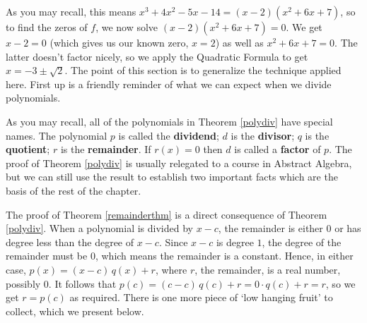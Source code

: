 \setlength\arraycolsep{5pt}
\setlength\extrarowheight{0pt}

As you may recall, this means $x^3 + 4x^2-5x-14=(x-2)\left(x^2+6x+7\right)$, so to find the zeros of $f$, we now solve $(x-2)\left(x^2+6x+7\right)=0$.   We get $x-2=0$ (which gives us our known zero, $x=2$) as well as $x^2+6x+7=0$.   The latter doesn't factor nicely, so we apply the Quadratic Formula to get $x = -3 \pm \sqrt{2}$.  The point of this section is to generalize the technique applied here.  First up is a friendly reminder of what we can expect when we divide polynomials.

\smallskip


\smallskip

As you may recall, all of the polynomials in Theorem \ref{polydiv} have special names.  The polynomial $p$ is called the  \textbf{dividend}; $d$ is the  \textbf{divisor}; $q$ is the  \textbf{quotient}; $r$ is the  \textbf{remainder}.  If $r(x)=0$ then $d$ is called a  \textbf{factor} of $p$.  The proof of Theorem \ref{polydiv} is usually relegated to a course in Abstract Algebra, but we can still use the result to establish two important facts which are the basis of the rest of the chapter.

\smallskip


\smallskip


The proof of Theorem \ref{remainderthm} is a direct consequence of Theorem \ref{polydiv}.  When a polynomial is divided by $x-c$, the remainder is either $0$ or has degree less than the degree of $x-c$.  Since $x-c$ is degree $1$, the degree of the remainder must be $0$, which means the remainder is a constant.  Hence, in either case, $p(x) = (x-c) \, q(x) + r$, where $r$, the remainder, is a real number, possibly $0$.  It follows that $p(c) = (c-c) \, q(c) + r = 0 \cdot q(c) + r = r$, so we get $r = p(c)$ as required.  There is one more piece of `low hanging fruit' to collect, which we present below.

